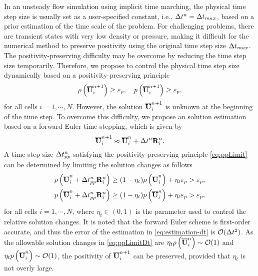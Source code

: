 In an unsteady flow simulation using implicit time marching, the physical time step size is usually set as a user-specified constant, i.e., $\mathrm\Delta t^n= \mathrm\Delta t_{max}$, based on a prior estimation of the time scale of the problem. For challenging problems, there are transient states with very low density or pressure, making it difficult for the numerical method to preserve positivity using the original time step size $\mathrm\Delta t_{max}$.
The positivity-preserving difficulty may be overcome by reducing the time step size temporarily. Therefore, we propose to control the physical time step size dynamically based on a positivity-preserving principle
\begin{equation}
    \label{eq:ppLimit}
    \rho\left(\overline{\mathbf{U}}_i^{n+1} \right)  \geq \varepsilon_\rho, \quad
    p\left(\overline{\mathbf{U}}_i^{n+1}\right) \geq \varepsilon_p ,
\end{equation}
for all cells $i=1, \cdots,N$.
However, the solution $\overline{\mathbf{U}}_i^{n+1}$ is unknown at the beginning of the time step. To overcome this difficulty, we propose an solution estimation based on a forward Euler time stepping, which is given by
\begin{equation}
    \label{eq:estimation-dt}
    \overline{\mathbf{U}}_i^{n+1} \approx  \overline{\mathbf{U}}_i^n + \mathrm\Delta t^{n}  \mathbf{R}_i^n.
\end{equation}
A time step size $ \mathrm\Delta t^{n}_{pp}$ satisfying the positivity-preserving principle \eqref{eq:ppLimit} can be determined by limiting the solution changes as follows
\begin{equation}
    \label{eq:ppLimitDt}
    \begin{aligned}
        \rho\left(\overline{\mathbf{U}}_i^n + \mathrm\Delta t^{n}_{pp}\mathbf{R}_i^n\right)
         & \geq
        (1- \eta_t)
        \rho\left(\overline{\mathbf{U}}_i^n\right)
        +
        \eta_t \varepsilon_\rho
        > \varepsilon_\rho, \\
        p\left(\overline{\mathbf{U}}_i^n + \mathrm\Delta t^{n}_{pp}\mathbf{R}_i^n\right)
         & \geq
        (1- \eta_t)
        p\left(\overline{\mathbf{U}}_i^n\right)
        +
        \eta_t \varepsilon_p
        > \varepsilon_p,
    \end{aligned}
\end{equation}
for all cells $i=1, \cdots,N$, where $\eta_t\in(0,1)$ is the parameter used to control the relative solution changes. It is noted that the forward Euler scheme is first-order accurate, and thus the error of the estimation in \eqref{eq:estimation-dt} is $\mathcal{O}(\mathrm\Delta t^2)$. As the allowable solution changes in \eqref{eq:ppLimitDt} are $\eta_t \rho\left(\overline{\mathbf{U}}_i^n\right) \sim \mathcal{O}(1)$ and $\eta_t p\left(\overline{\mathbf{U}}_i^n\right) \sim \mathcal{O}(1)$, the positivity of $\overline{\mathbf{U}}_i^{n+1}$  can be preserved, provided that $\eta_t$ is not overly large.

